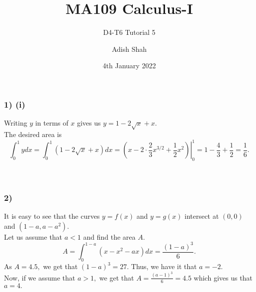\documentclass[handout]{beamer}
\title[MA109 Calculus-I] %
{MA109 Calculus-I}
\subtitle{D4-T6 Tutorial 5}
\author[Adish Shah] %
{Adish Shah}
\date[4th January 2022] %
{4th January 2022}
\begin{document}
\frame{\titlepage}



\begin{frame}
	\frametitle{1) (i)}
	Writing $y$ in terms of $x$ gives us $y = 1 - 2\sqrt{x} + x.$\\
	The desired area is $$\displaystyle\int_{0}^{1} y dx = \int_{0}^{1} (1 - 2\sqrt{x} + x) dx = \left.\left(x - 2\cdot\frac{2}{3}x^{3/2} + \frac{1}{2}x^2\right)\right|_{0}^{1} = 1 - \frac{4}{3} + \dfrac{1}{2} = \frac{1}{6}. $$\\~\\
\end{frame}


\begin{frame}
	\frametitle{2)}
    It is easy to see that the curves $y = f(x)$ and $y = g(x)$ intersect at $(0, 0)$ and $(1-a, a-a^2).$\\
	Let us assume that $a < 1$ and find the area $A.$
	\[A = \int_{0}^{1-a} (x - x^2 - ax) dx = \frac{(1-a)^3}{6}.\]
	As $A = 4.5,$ we get that $(1 - a)^3 = 27.$ Thus, we have it that $a = -2.$\\
	Now, if we assume that $a > 1,$ we get that $A = \frac{(a-1)^3}{6} = 4.5$ which gives us that $a = 4.$
\end{frame}
\end{document}
